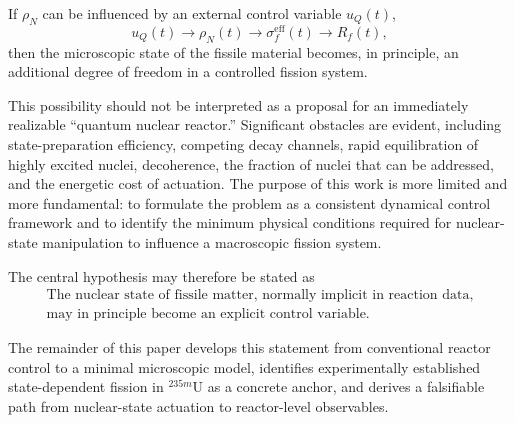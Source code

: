 If $\rho_N$ can be influenced by an external control variable $u_Q(t)$,
\begin{equation}
u_Q(t)
\longrightarrow
\rho_N(t)
\longrightarrow
\sigma_f^{\mathrm{eff}}(t)
\longrightarrow
R_f(t),
\label{eq:central_chain_intro}
\end{equation}
then the microscopic state of the fissile material becomes, in principle, an additional degree of freedom in a controlled fission system.

This possibility should not be interpreted as a proposal for an immediately realizable ``quantum nuclear reactor.'' Significant obstacles are evident, including state-preparation efficiency, competing decay channels, rapid equilibration of highly excited nuclei, decoherence, the fraction of nuclei that can be addressed, and the energetic cost of actuation. The purpose of this work is more limited and more fundamental: to formulate the problem as a consistent dynamical control framework and to identify the minimum physical conditions required for nuclear-state manipulation to influence a macroscopic fission system.

The central hypothesis may therefore be stated as
\begin{equation}
\boxed{
\begin{gathered}
\text{The nuclear state of fissile matter, normally implicit in reaction data,}\\
\text{may in principle become an explicit control variable.}
\end{gathered}
}
\end{equation}

The remainder of this paper develops this statement from conventional reactor control to a minimal microscopic model, identifies experimentally established state-dependent fission in $^{235m}$U as a concrete anchor, and derives a falsifiable path from nuclear-state actuation to reactor-level observables.
